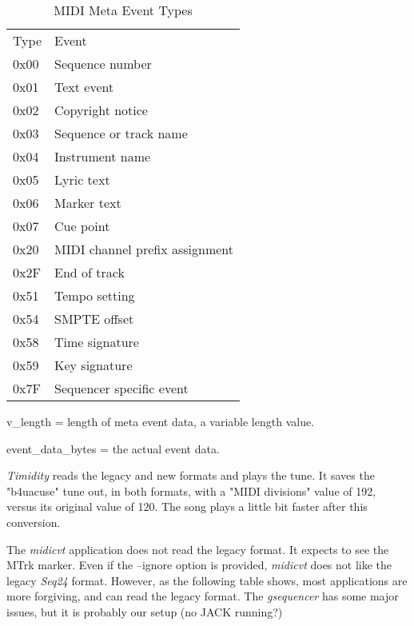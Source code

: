    \begin{table}
      \caption{MIDI Meta Event Types}
      \label{table:midi_meta_event_types}
      \begin{tabular}{l l}
         Type	& Event \\
         0x00	& Sequence number \\
         0x01	& Text event \\
         0x02	& Copyright notice \\
         0x03	& Sequence or track name \\
         0x04	& Instrument name \\
         0x05	& Lyric text \\
         0x06	& Marker text \\
         0x07	& Cue point \\
         0x20	& MIDI channel prefix assignment \\
         0x2F	& End of track \\
         0x51	& Tempo setting \\
         0x54	& SMPTE offset \\
         0x58	& Time signature \\
         0x59	& Key signature \\
         0x7F	& Sequencer specific event \\
      \end{tabular}
   \end{table}

v\_length = length of meta event data, a variable length value.

event\_data\_bytes = the actual event data.

\textsl{Timidity} reads the legacy and new formats and plays the tune.  It
saves the "b4uacuse" tune out, in both formats, with a "MIDI divisions"
value of 192, versus its original value of 120.  The song
plays a little bit faster after this conversion.

The \textsl{midicvt} application does not read the legacy format.  It
expects to see the MTrk marker.  Even if the --ignore option is provided,
\textsl{midicvt} does not like the legacy \textsl{Seq24} format.
However, as the following table shows, most applications are more forgiving,
and can read the legacy format.  The \textsl{gsequencer} has some major
issues, but it is probably our setup (no JACK running?)

